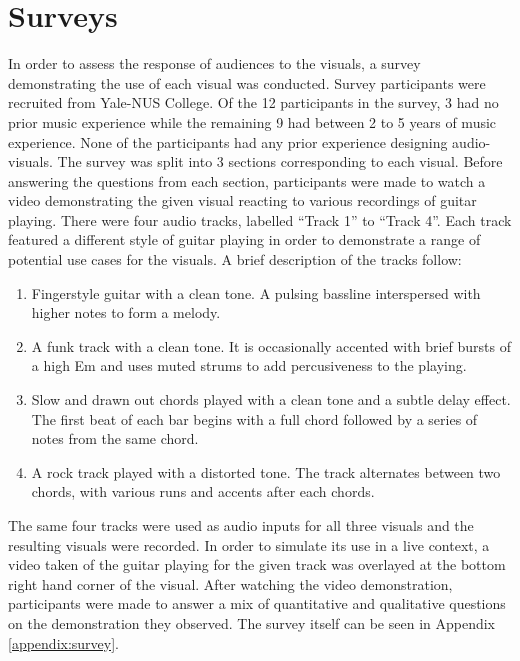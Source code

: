 \documentclass[../initial_thesis.tex]{subfiles}
\begin{document}
\section{Surveys} \label{sec:surveys}

In order to assess the response of audiences to the visuals, a survey demonstrating the use of each visual was conducted. Survey participants were recruited from Yale-NUS College. Of the 12 participants in the survey, 3 had no prior music experience while the remaining 9 had between 2 to 5 years of music experience. None of the participants had any prior experience designing audio-visuals. The survey was split into 3 sections corresponding to each visual. Before answering the questions from each section, participants were made to watch a video demonstrating the given visual reacting to various recordings of guitar playing. There were four audio tracks, labelled ``Track 1'' to ``Track 4''. Each track featured a different style of guitar playing in order to demonstrate a range of potential use cases for the visuals. A brief description of the tracks follow:

\begin{enumerate}
\item {Fingerstyle guitar with a clean tone. A pulsing bassline interspersed with higher notes to form a melody.} %
\item {A funk track with a clean tone. It is occasionally accented with brief bursts of a high Em and uses muted strums to add percusiveness to the playing.}
\item {Slow and drawn out chords played with a clean tone and a subtle delay effect. The first beat of each bar begins with a full chord followed by a series of notes from the same chord.}
\item {A rock track played with a distorted tone. The track alternates between two chords, with various runs and accents after each chords.}
\end{enumerate}

The same four tracks were used as audio inputs for all three visuals and the resulting visuals were recorded. In order to simulate its use in a live context, a video taken of the guitar playing for the given track was overlayed at the bottom right hand corner of the visual. After watching the video demonstration, participants were made to answer a mix of quantitative and qualitative questions on the demonstration they observed. The survey itself can be seen in Appendix \ref{appendix:survey}. \par
\end{document}
